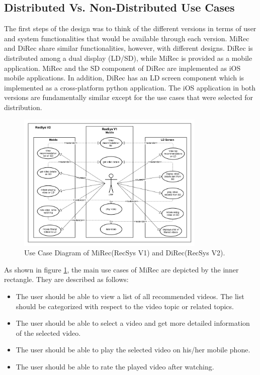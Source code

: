 \subsection{Distributed Vs. Non-Distributed Use Cases}
The first steps of the design was to think of the different versions in terms
of user and system functionalities that would be available through each version.
MiRec and DiRec share similar functionalities, however, with different designs.
DiRec is distributed among a dual display (LD/SD), while MiRec is provided as a
mobile application. MiRec and the SD component of DiRec are implemented as iOS mobile applications.
In addition, DiRec has an LD screen component which is implemented as a
cross-platform python application. The iOS application in both versions are
fundamentally similar except for the use cases that were selected for distribution.
\begin{figure}[h]
\includegraphics[width=0.8\textwidth, center, center]{figures/usecase}
\caption{Use Case Diagram of MiRec(RecSys V1) and DiRec(RecSys V2).}
\label{fig:figure42}
\end{figure}
As shown in figure \ref{fig:figure42}, the main use cases of MiRec are depicted
by the inner rectangle. They are described as follows:
\begin{itemize}
  \item The user should be able to view a list of all recommended videos. The list should be categorized with respect to the video topic or related topics.
  \item The user should be able to select a video and get more detailed
  information of the selected video.
  \item The user should be able to play the selected video on his/her mobile phone.
  \item The user should be able to rate the played video after watching.
\end{itemize}
